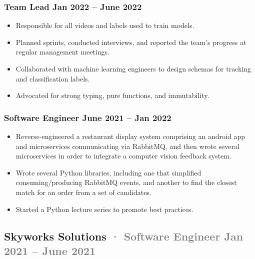 \documentclass[12pt]{article} %
\providecommand{\tightlist}{%
  \setlength{\itemsep}{0pt}\setlength{\parskip}{0pt}}
\renewcommand{\emph}[1]{%
  \textcolor{gray}{#1}%
}
\begin{document}
\begin{paracol}{2}
\begin{raggedright}
\vspace{-5pt}

\hypertarget{team-lead-jan-2022-june-2022}{%
\subsubsection{\texorpdfstring{\small Team Lead \hfill Jan 2022 -- June
2022}{Team Lead Jan 2022 -- June 2022}}\label{team-lead-jan-2022-june-2022}}

\begin{itemize}
\tightlist
\item
  Responsible for all videos and labels used to train models.
\item
  Planned sprints, conducted interviews, and reported the team's
  progress at regular management meetings.
\item
  Collaborated with machine learning engineers to design schemas for
  tracking and classification labels.
\item
  Advocated for strong typing, pure functions, and immutability.
\end{itemize}

\hypertarget{software-engineer-june-2021-jan-2022}{%
\subsubsection{\texorpdfstring{\small Software Engineer \hfill June 2021
-- Jan
2022}{Software Engineer June 2021 -- Jan 2022}}\label{software-engineer-june-2021-jan-2022}}

\begin{itemize}
\tightlist
\item
  Reverse-engineered a restaurant display system comprising an android
  app and microservices communicating via RabbitMQ, and then wrote
  several microservices in order to integrate a computer vision feedback
  system.
\item
  Wrote several Python libraries, including one that simplified
  consuming/producing RabbitMQ events, and another to find the closest
  match for an order from a set of candidates.
\item
  Started a Python lecture series to promote best practices.
\end{itemize}

\hypertarget{skyworks-solutions-software-engineer-jan-2021-june-2021}{%
\subsection{\texorpdfstring{Skyworks Solutions \emph{· \small Software
Engineer \hfill Jan 2021 -- June
2021}}{Skyworks Solutions · Software Engineer Jan 2021 -- June 2021}}\label{skyworks-solutions-software-engineer-jan-2021-june-2021}}


\end{raggedright}
\end{paracol}
\end{document}
